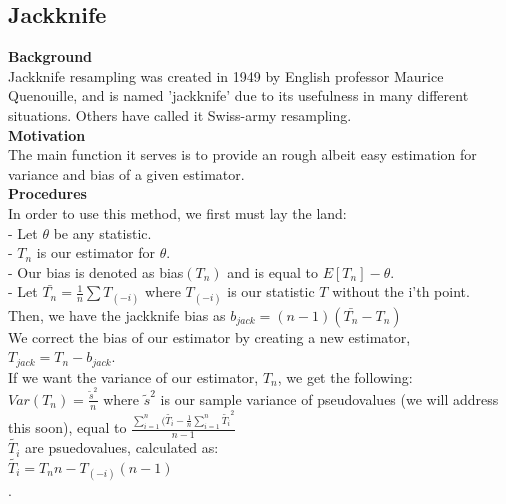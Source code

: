 \documentclass[12pt]{article}
\begin{document}
\begin{flushleft}
\section{Jackknife}\label{sec:chapter}
\textbf{Background}\\
Jackknife resampling was created in 1949 by English professor Maurice Quenouille, and is named 'jackknife' due to its usefulness in many different situations. Others have called it Swiss-army resampling.\\
\textbf{Motivation}\\
The main function it serves is to provide an rough albeit easy estimation for variance and bias of a given estimator.\\
\textbf{Procedures}\\
In order to use this method, we first must lay the land:\\
- Let \(\theta\) be any statistic.\\
- \(T_n\) is our estimator for \(\theta\).\\
- Our bias is denoted as bias\((T_n)\) and is equal to \(E[T_n] - \theta\).\\
- Let \(\bar{T_n} = \frac{1}{n}\sum{T_{(-i)}}\) where \(T_{(-i)}\) is our statistic \(T\) without the i'th point.\\
Then, we have the jackknife bias as \(b_{jack} = (n - 1)(\bar{T_n} - T_n)\)\\
We correct the bias of our estimator by creating a new estimator, \(T_{jack} = T_n - b_{jack}\).\\
If we want the variance of our estimator, \(T_n\), we get the following:\\
\(Var(T_n) = \frac{\tilde{s}^2}{n}\) where \(\tilde{s}^2\) is our sample variance of pseudovalues (we will address this soon), equal to \(\frac{\sum_{i=1}^{n}{(\tilde{T_i} - \frac{1}{n}\sum_{i=1}^{n}{\tilde{T_i}}}^2}{n - 1}\)\\
\(\tilde{T_i}\) are psuedovalues, calculated as:\\
\(\tilde{T_i} = T_nn - T_{(-i)}(n - 1)\)\\.


\end{flushleft}
\end{document}

